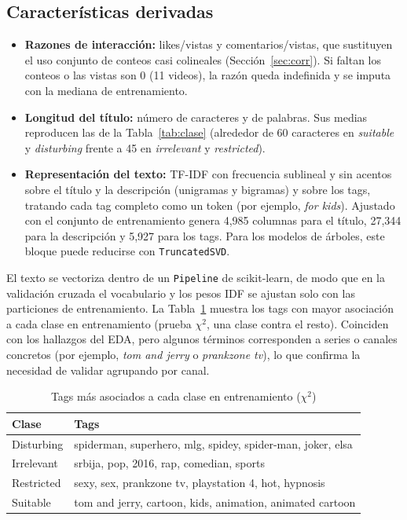 \documentclass[conference]{IEEEtran}
\begin{document}
\subsection{Características derivadas}
\begin{itemize}
\item \textbf{Razones de interacción:} likes/vistas y comentarios/vistas, que sustituyen el uso conjunto de conteos casi colineales (Sección~\ref{sec:corr}). Si faltan los conteos o las vistas son 0 (11 videos), la razón queda indefinida y se imputa con la mediana de entrenamiento.
\item \textbf{Longitud del título:} número de caracteres y de palabras. Sus medias reproducen las de la Tabla~\ref{tab:clase} (alrededor de 60 caracteres en \textit{suitable} y \textit{disturbing} frente a 45 en \textit{irrelevant} y \textit{restricted}).
\item \textbf{Representación del texto:} TF-IDF con frecuencia sublineal y sin acentos sobre el título y la descripción (unigramas y bigramas) y sobre los tags, tratando cada tag completo como un token (por ejemplo, \textit{for kids}). Ajustado con el conjunto de entrenamiento genera 4,985 columnas para el título, 27,344 para la descripción y 5,927 para los tags. Para los modelos de árboles, este bloque puede reducirse con \texttt{TruncatedSVD}.
\end{itemize}
El texto se vectoriza dentro de un \texttt{Pipeline} de scikit-learn, de modo que en la validación cruzada el vocabulario y los pesos IDF se ajustan solo con las particiones de entrenamiento. La Tabla~\ref{tab:terms} muestra los tags con mayor asociación a cada clase en entrenamiento (prueba $\chi^2$, una clase contra el resto). Coinciden con los hallazgos del EDA, pero algunos términos corresponden a series o canales concretos (por ejemplo, \textit{tom and jerry} o \textit{prankzone tv}), lo que confirma la necesidad de validar agrupando por canal.

\begin{table}[!t]
\caption{Tags más asociados a cada clase en entrenamiento ($\chi^2$)}
\begin{center}
\footnotesize
\begin{tabular}{|l|p{6.2cm}|}
\hline
\textbf{Clase} & \textbf{Tags} \\
\hline
Disturbing & spiderman, superhero, mlg, spidey, spider-man, joker, elsa \\
\hline
Irrelevant & srbija, pop, 2016, rap, comedian, sports \\
\hline
Restricted & sexy, sex, prankzone tv, playstation 4, hot, hypnosis \\
\hline
Suitable & tom and jerry, cartoon, kids, animation, animated cartoon \\
\hline
\end{tabular}
\label{tab:terms}
\end{center}
\end{table}
\end{document}
